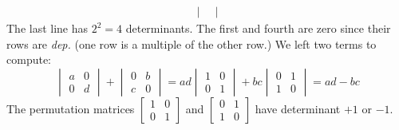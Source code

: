 \begin{example}
\[\begin{aligned}
\begin{vmatrix}
\end{vmatrix}
\end{aligned}
\]
The last line has $2^2=4$ determinants. The first and fourth are zero since their rows are \emph{dep.} (one row is a multiple of the other row.) We left two terms to compute:
\[
\begin{vmatrix}
a&0\\0&d
\end{vmatrix}+\begin{vmatrix}
0&b\\c&0
\end{vmatrix}=ad\begin{vmatrix}
1&0\\0&1
\end{vmatrix}+bc\begin{vmatrix}
0&1\\1&0
\end{vmatrix}=ad-bc
\]
The permutation matrices $\begin{bmatrix}
1&0\\0&1
\end{bmatrix}$ and $\begin{bmatrix}
0&1\\1&0
\end{bmatrix}$ have determinant $+1$ or $-1$.
\end{example}

